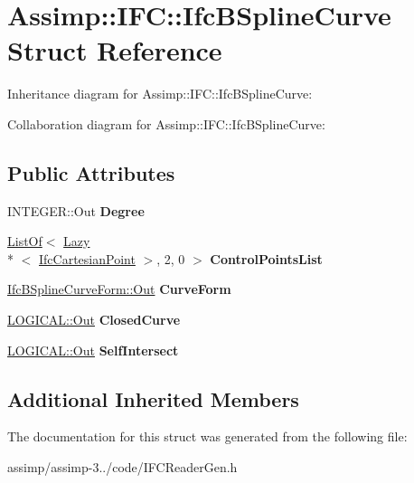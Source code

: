 \hypertarget{struct_assimp_1_1_i_f_c_1_1_ifc_b_spline_curve}{\section{Assimp\+:\+:I\+F\+C\+:\+:Ifc\+B\+Spline\+Curve Struct Reference}
\label{struct_assimp_1_1_i_f_c_1_1_ifc_b_spline_curve}
}


Inheritance diagram for Assimp\+:\+:I\+F\+C\+:\+:Ifc\+B\+Spline\+Curve\+:


Collaboration diagram for Assimp\+:\+:I\+F\+C\+:\+:Ifc\+B\+Spline\+Curve\+:
\subsection*{Public Attributes}
\begin{DoxyCompactItemize}
\item 
\hypertarget{struct_assimp_1_1_i_f_c_1_1_ifc_b_spline_curve_ab71d964b23ec40f8a645e39c994ffaba}{I\+N\+T\+E\+G\+E\+R\+::\+Out {\bfseries Degree}}\label{struct_assimp_1_1_i_f_c_1_1_ifc_b_spline_curve_ab71d964b23ec40f8a645e39c994ffaba}

\item 
\hypertarget{struct_assimp_1_1_i_f_c_1_1_ifc_b_spline_curve_a22154c83a3a78eeb82cedbc65691abac}{\hyperlink{struct_assimp_1_1_s_t_e_p_1_1_list_of}{List\+Of}$<$ \hyperlink{struct_assimp_1_1_s_t_e_p_1_1_lazy}{Lazy}\\*
$<$ \hyperlink{struct_assimp_1_1_i_f_c_1_1_ifc_cartesian_point}{Ifc\+Cartesian\+Point} $>$, 2, 0 $>$ {\bfseries Control\+Points\+List}}\label{struct_assimp_1_1_i_f_c_1_1_ifc_b_spline_curve_a22154c83a3a78eeb82cedbc65691abac}

\item 
\hypertarget{struct_assimp_1_1_i_f_c_1_1_ifc_b_spline_curve_a7dfb81143b077bb22d2bb8924e0bcabe}{\hyperlink{classboost_1_1shared__ptr}{Ifc\+B\+Spline\+Curve\+Form\+::\+Out} {\bfseries Curve\+Form}}\label{struct_assimp_1_1_i_f_c_1_1_ifc_b_spline_curve_a7dfb81143b077bb22d2bb8924e0bcabe}

\item 
\hypertarget{struct_assimp_1_1_i_f_c_1_1_ifc_b_spline_curve_a659b3e655829a5a2219838f0f0cd3bdc}{\hyperlink{classboost_1_1shared__ptr}{L\+O\+G\+I\+C\+A\+L\+::\+Out} {\bfseries Closed\+Curve}}\label{struct_assimp_1_1_i_f_c_1_1_ifc_b_spline_curve_a659b3e655829a5a2219838f0f0cd3bdc}

\item 
\hypertarget{struct_assimp_1_1_i_f_c_1_1_ifc_b_spline_curve_a08ff34de52bc9a3f629315405543c100}{\hyperlink{classboost_1_1shared__ptr}{L\+O\+G\+I\+C\+A\+L\+::\+Out} {\bfseries Self\+Intersect}}\label{struct_assimp_1_1_i_f_c_1_1_ifc_b_spline_curve_a08ff34de52bc9a3f629315405543c100}

\end{DoxyCompactItemize}
\subsection*{Additional Inherited Members}


The documentation for this struct was generated from the following file\+:\begin{DoxyCompactItemize}
\item 
assimp/assimp-\/3../code/I\+F\+C\+Reader\+Gen.\+h\end{DoxyCompactItemize}
